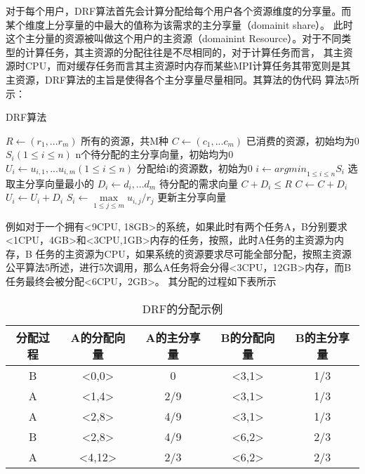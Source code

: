 对于每个用户，DRF算法首先会计算分配给每个用户各个资源维度的分享量。而某个维度上分享量的中最大的值称为该需求的主分享量（domainit share）。
此时这个主分量的资源被叫做这个用户的主资源（domainint Resource）。对于不同类型的计算任务，其主资源的分配往往是不尽相同的，对于计算任务而言，
其主资源时CPU，而对缓存任务而言其主资源时内存而某些MPI计算任务其带宽则是其主资源，DRF算法的主旨是使得各个主分享量尽量相同。其算法的伪代码
算法5所示：
\begin{algorithm} 
\caption {DRF算法} 
\begin{codebox}
\li	$R \leftarrow \left({r}_{1},...{r}_{m} \right)$ \RComment 所有的资源，共M种
\li	$C \leftarrow \left({c}_{1},...{c}_{m}\right)$ \RComment 已消费的资源，初始均为0
\li	${S}_{i} (1 \leq i \leq n)$				\RComment n个待分配的主分享向量，初始均为0
\li	${U}_{i} \leftarrow {{u}_{i,1},...{u}_{i,m}}(1 \leq i \leq n)$	\RComment 分配给i的资源数，初始为0
\li	$i \leftarrow {argmin}_{1 \leq i \leq n} {{S}_{i}}$ \RComment 选取主分享向量最小的
\li	${D}_{i} \leftarrow {{d}_{i},...{d}_{m}}$ \RComment 待分配的需求向量
\li	\If $C + {D}_{i} \leq R$
\li	\Then 
		$C \leftarrow C + D_{i}$                  
\li            	${U}_{i} \leftarrow {U}_{i} + {D}_{i}$ 
\li		${S}_{i} \leftarrow \max \limits_{1 \leq j \leq m} {{{u}_{i,j}}/{r}_{j}}$ \RComment 更新主分享向量
\li	\Else
\li		\Return
	\End
\end{codebox}
\end{algorithm} 

例如对于一个拥有<9CPU, 18GB>的系统，如果此时有两个任务A，B分别要求<1CPU，4GB>和<3CPU,1GB>内存的任务，按照，此时A任务的主资源为内存，B
任务的主资源为CPU，如果系统的资源要求尽可能全部分配，按照主资源公平算法5所述，进行5次调用，那么A任务将会分得<3CPU，12GB>内存，而B任务最终会被分配<6CPU，2GB>。
其分配的过程如下表所示
\begin{table}[htp]

\begin{center}
\begin{tabular}{|c|c|c|c|c|}
\hline
分配过程 & A的分配向量&A的主分享量&B的分配向量&B的主分享量\\
\hline
B & <0,0> & 0 & <3,1> & 1/3\\
\hline
A & <1,4> & 2/9 & <3,1> & 1/3\\
\hline
A & <2,8> & 4/9 & <3,1> &1/3\\
\hline
B & <2,8> & 4/9 & <6,2> & 2/3\\
\hline
A & <4,12> & 2/3 & <6,2> & 2/3\\
\hline
\end{tabular}
\end{center}
\caption{DRF的分配示例}
\label{tab:drfexample}
\end{table}

